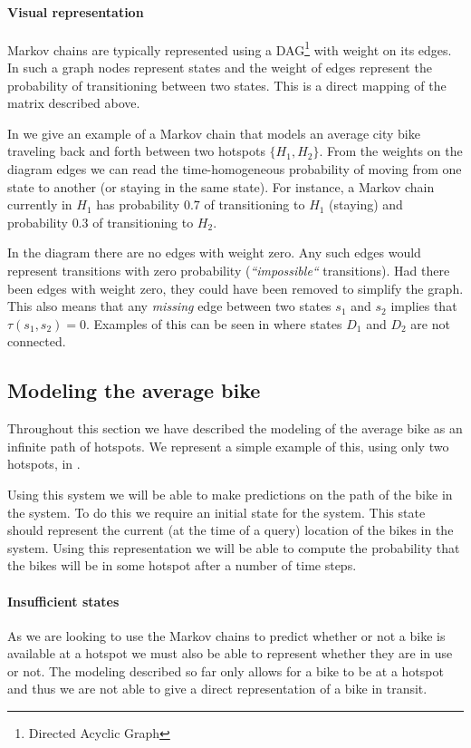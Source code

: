 \paragraph{Visual representation}
Markov chains are typically represented using a DAG\footnote{Directed Acyclic Graph} with weight on its edges.
In such a graph nodes represent states and the weight of edges represent the probability of transitioning between two states.
This is a direct mapping of the matrix described above.

In  we give an example of a Markov chain that models an average city bike traveling back and forth between two hotspots $\{H_1, H_2\}$.
From the weights on the diagram edges we can read the time-homogeneous probability of moving from one state to another (or staying in the same state).
For instance, a Markov chain currently in $H_1$ has probability $0.7$ of transitioning to $H_1$ (staying) and probability $0.3$ of transitioning to $H_2$.

In the diagram there are no edges with weight zero.
Any such edges would represent transitions with zero probability (\textit{``impossible``} transitions).
Had there been edges with weight zero, they could have been removed to simplify the graph.
This also means that any \textit{missing} edge between two states $s_1$ and $s_2$ implies that $\tau(s_1, s_2) = 0$.
Examples of this can be seen in  where states $D_1$ and $D_2$ are not connected.

\subsection{Modeling the average bike}\label{markov:modeling}
Throughout this section we have described the modeling of the average bike as an infinite path of hotspots.
We represent a simple example of this, using only two hotspots, in .

Using this system we will be able to make predictions on the path of the bike in the system.
To do this we require an initial state for the system.
This state should represent the current (at the time of a query) location of the bikes in the system.
Using this representation we will be able to compute the probability that the bikes will be in some hotspot after a number of time steps.

\paragraph{Insufficient states}
As we are looking to use the Markov chains to predict whether or not a bike is available at a hotspot we must also be able to represent whether they are in use or not.
The modeling described so far only allows for a bike to be at a hotspot and thus we are not able to give a direct representation of a bike in transit.

